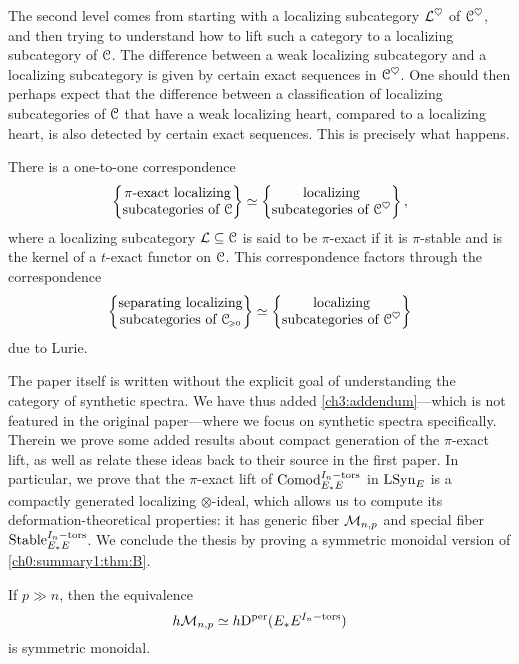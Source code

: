The second level comes from starting with a localizing subcategory $\mathcal{L}^\heartsuit$ of $\EuScript{C}^\heartsuit$, and then trying to understand how to lift such a category to a localizing subcategory of $\EuScript{C}$. The difference between a weak localizing subcategory and a localizing subcategory is given by certain exact sequences in $\EuScript{C}^\heartsuit$. One should then perhaps expect that the difference between a classification of localizing subcategories of $\EuScript{C}$ that have a weak localizing heart, compared to a localizing heart, is also detected by certain exact sequences. This is precisely what happens.

\begin{theorem}
    There is a one-to-one correspondence
    \[\left\{ \begin{matrix} \pi\text{-exact localizing}\\ \text{subcategories of }\EuScript{C} \end{matrix} \right\} \simeq \left\{ \begin{matrix} \text{localizing}\\ \text{subcategories of }\EuScript{C}^\heartsuit \end{matrix} \right\},\]
    where a localizing subcategory $\mathcal{L}\subseteq \EuScript{C}$ is said to be $\pi$-exact if it is $\pi$-stable and is the kernel of a $t$-exact functor on $\EuScript{C}$. This correspondence factors through the correspondence
    \[\left\{ \begin{matrix} \text{separating localizing}\\ \text{subcategories of }\EuScript{C}_{\hspace{-1pt}\scriptscriptstyle\geqslant 0} \end{matrix} \right\} \simeq \left\{ \begin{matrix} \text{localizing}\\ \text{subcategories of }\EuScript{C}^\heartsuit \end{matrix} \right\}\]
    due to Lurie. 
\end{theorem}

The paper itself is written without the explicit goal of understanding the category of synthetic spectra. We have thus added \cref{ch3:addendum}---which is not featured in the original paper---where we focus on synthetic spectra specifically. Therein we prove some added results about compact generation of the $\pi$-exact lift, as well as relate these ideas back to their source in the first paper. In particular, we prove that the $\pi$-exact lift of $\mathrm{Comod}_{E_*E}^{I_n-\mathrm{tors}}$ in $\mathrm{LSyn}_{E}$ is a compactly generated localizing $\otimes$-ideal, which allows us to compute its deformation-theoretical properties: it has generic fiber $\mathcal{M}_{n,p}$ and special fiber $\mathrm{Stable}_{E_*E}^{I_n-\mathrm{tors}}$. We conclude the thesis by proving a symmetric monoidal version of \cref{ch0:summary1:thm:B}. 

\begin{theorem}
    If $p\gg n$, then the equivalence
    \[h\mathcal{M}_{n,p} \simeq h \mathrm{D}^{\mathrm{per}}(E_*E^{I_n-\mathrm{tors}})\] 
    is symmetric monoidal. 
\end{theorem}
